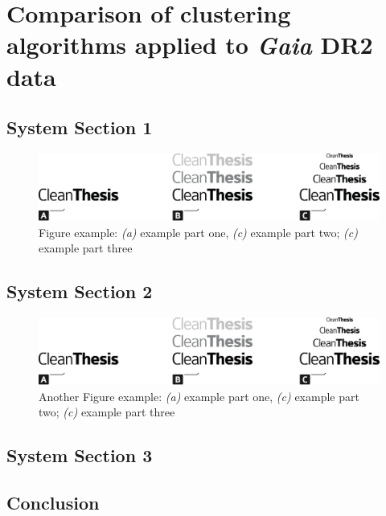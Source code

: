 %
\chapter{Comparison of clustering algorithms applied to \emph{Gaia} DR2 data}
\label{sec:comparison}


\Blindtext[2][1]

\section{System Section 1}
\label{sec:comparison:sec1}

\Blindtext[1][2]

\begin{figure}[htb]
	\includegraphics[width=\textwidth]{gfx/Clean-Thesis-Figure}
	\caption{Figure example: \textit{(a)} example part one, \textit{(c)} example part two; \textit{(c)} example part three}
	\label{fig:comparison:example1}
\end{figure}

\Blindtext[1][2]

\section{System Section 2}
\label{sec:comparison:sec2}

\Blindtext[1][2]

\begin{figure}[htb]
	\includegraphics[width=\textwidth]{gfx/Clean-Thesis-Figure}
	\caption{Another Figure example: \textit{(a)} example part one, \textit{(c)} example part two; \textit{(c)} example part three}
	\label{fig:comparison:example2}
\end{figure}

\Blindtext[2][2]

\section{System Section 3}
\label{sec:comparison:sec3}

\Blindtext[4][2]

\section{Conclusion}
\label{sec:comparison:conclusion}

\Blindtext[2][1]
